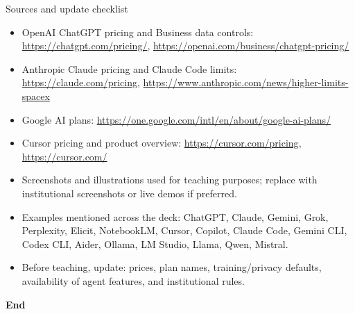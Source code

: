 \documentclass[aspectratio=169,10pt]{beamer}
\begin{document}
\begin{frame}{Sources and update checklist}
\scriptsize
\begin{itemize}
\item OpenAI ChatGPT pricing and Business data controls: \url{https://chatgpt.com/pricing/}, \url{https://openai.com/business/chatgpt-pricing/}
\item Anthropic Claude pricing and Claude Code limits: \url{https://claude.com/pricing}, \url{https://www.anthropic.com/news/higher-limits-spacex}
\item Google AI plans: \url{https://one.google.com/intl/en/about/google-ai-plans/}
\item Cursor pricing and product overview: \url{https://cursor.com/pricing}, \url{https://cursor.com/}
\item Screenshots and illustrations used for teaching purposes; replace with institutional screenshots or live demos if preferred.\item Examples mentioned across the deck: ChatGPT, Claude, Gemini, Grok, Perplexity, Elicit, NotebookLM, Cursor, Copilot, Claude Code, Gemini CLI, Codex CLI, Aider, Ollama, LM Studio, Llama, Qwen, Mistral.
\item Before teaching, update: prices, plan names, training/privacy defaults, availability of agent features, and institutional rules.
\end{itemize}
\vfill
\begin{center}\Large\bfseries\color{deepblue}End\end{center}
\end{frame}
\end{document}
